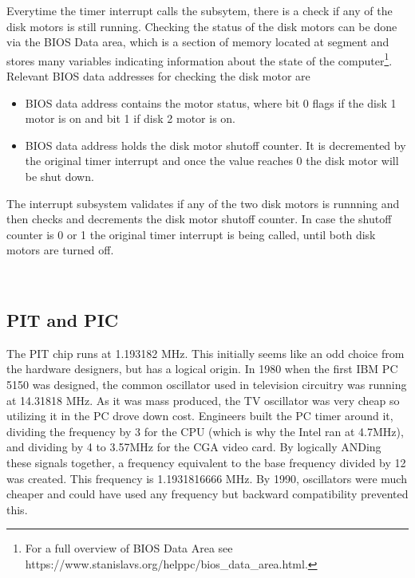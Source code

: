 \documentclass[book.tex]{subfiles}
\begin{document}
\par
Everytime the timer interrupt calls the subsytem, there is a check if any of the disk motors is still running. Checking the status of the disk motors can be done via the BIOS Data area, which is a section of memory located at segment  and stores many variables indicating information about the state of the computer\footnote{For a full overview of BIOS Data Area see https://www.stanislavs.org/helppc/bios\_data\_area.html.}. Relevant BIOS data addresses for checking the disk motor are
\begin{itemize}
  \item BIOS data address  contains the motor status, where bit 0 flags if the disk 1 motor is on and bit 1 if disk 2 motor is on.
  \item BIOS data address  holds the disk motor shutoff counter. It is decremented by the original timer interrupt and once the value reaches 0 the disk motor will be shut down.
\end{itemize}

The interrupt subsystem validates if any of the two disk motors is runnning and then checks and decrements the disk motor shutoff counter. In case the shutoff counter is 0 or 1 the original timer interrupt is being called, until both disk motors are turned off.
\\

\par
\begin{minipage}{\textwidth}

\end{minipage}\\
\par


\subsection{PIT and PIC}
The PIT chip runs at 1.193182 MHz. This initially seems like an odd choice from the hardware designers, but has a logical origin. In 1980 when the first IBM PC 5150 was designed, the common oscillator used in television circuitry was running at 14.31818 MHz. As it was mass produced, the TV oscillator was very cheap so utilizing it in the PC drove down cost. Engineers built the PC timer around it, dividing the frequency by 3 for the CPU (which is why the Intel ran at 4.7MHz), and dividing by 4 to 3.57MHz for the CGA video card. By logically ANDing these signals together, a frequency equivalent to the base frequency divided by 12 was created. This frequency is 1.1931816666 MHz. By 1990, oscillators were much cheaper and could have used any frequency but backward compatibility prevented this.\\
\end{document}
